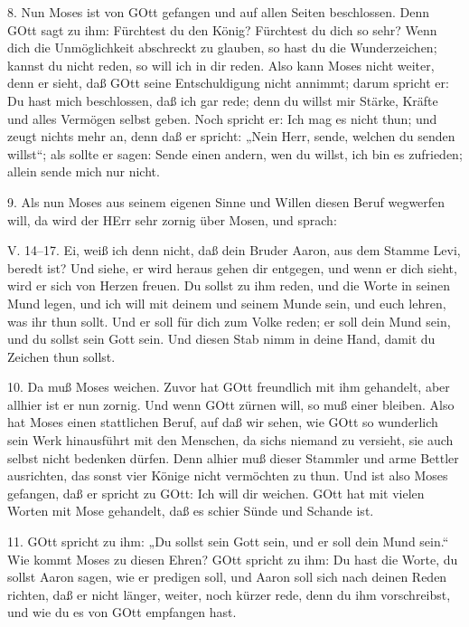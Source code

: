 8. Nun Moses ist von GOtt gefangen und auf allen Seiten beschlossen. Denn GOtt sagt zu ihm: Fürchtest du den König? Fürchtest du dich so sehr? Wenn dich die Unmöglichkeit abschreckt zu glauben, so hast du die Wunderzeichen; kannst du nicht reden, so will ich in dir reden. Also kann Moses nicht weiter, denn er sieht, daß GOtt seine Entschuldigung nicht annimmt; darum spricht er: Du hast mich beschlossen, daß ich gar rede; denn du willst mir Stärke, Kräfte und alles Vermögen selbst geben. Noch spricht er: Ich mag es nicht thun; und zeugt nichts mehr an, denn daß er spricht: „Nein Herr, sende, welchen du senden willst“; als sollte er sagen: Sende einen andern, wen du willst, ich bin es zufrieden; allein sende mich nur nicht.

9. Als nun Moses aus seinem eigenen Sinne und Willen diesen Beruf wegwerfen will, da wird der HErr sehr zornig über Mosen, und sprach:

\begin{schriftzitat}
V. 14–17. Ei, weiß ich denn nicht, daß dein Bruder Aaron, aus dem Stamme Levi, beredt ist? Und siehe, er wird heraus gehen dir entgegen, und wenn er dich sieht, wird er sich von Herzen freuen. Du sollst zu ihm reden, und die Worte in seinen Mund legen, und ich will mit deinem und seinem Munde sein, und euch lehren, was ihr thun sollt. Und er soll für dich zum Volke reden; er soll dein Mund sein, und du sollst sein Gott sein. Und diesen Stab nimm in deine Hand, damit du Zeichen thun sollst.
\end{schriftzitat}

10. Da muß Moses weichen. Zuvor hat GOtt freundlich mit ihm gehandelt, aber allhier ist er nun zornig. Und wenn GOtt zürnen will, so muß einer bleiben. Also hat Moses einen stattlichen Beruf, auf daß wir sehen, wie GOtt so wunderlich sein Werk hinausführt mit
den Menschen, da sichs niemand zu versieht, sie auch selbst nicht bedenken dürfen. Denn alhier muß dieser Stammler und arme Bettler ausrichten, das sonst vier Könige nicht vermöchten zu thun. Und ist also Moses gefangen, daß er spricht zu GOtt: Ich will dir weichen. GOtt hat mit vielen Worten mit Mose gehandelt, daß es schier Sünde und Schande ist.

11. GOtt spricht zu ihm: „Du sollst sein Gott sein, und er soll dein Mund sein.“ Wie kommt Moses zu diesen Ehren? GOtt spricht zu ihm: Du hast die Worte, du sollst Aaron sagen, wie er predigen soll, und Aaron soll sich nach deinen Reden richten, daß er nicht länger, weiter, noch kürzer rede, denn du ihm vorschreibst, und wie du es von GOtt empfangen hast.

